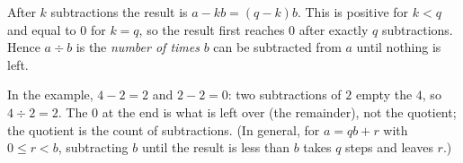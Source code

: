 After $k$ subtractions the result is $a-kb=(q-k)b$. This is positive for $k<q$ and equal to $0$ for $k=q$, so the result first reaches $0$ after exactly $q$ subtractions. Hence $a\div b$ is the \emph{number of times} $b$ can be subtracted from $a$ until nothing is left.

In the example, $4-2=2$ and $2-2=0$: two subtractions of $2$ empty the $4$, so $4\div2=\boxed{2}$. The $0$ at the end is what is left over (the remainder), not the quotient; the quotient is the count of subtractions. (In general, for $a=qb+r$ with $0\le r<b$, subtracting $b$ until the result is less than $b$ takes $q$ steps and leaves $r$.)
